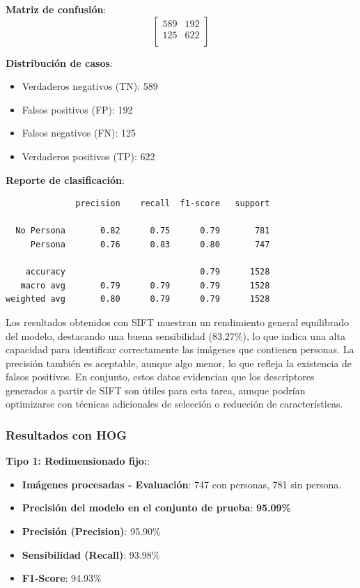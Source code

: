 \documentclass[a4paper]{article}
\begin{document}
\textbf{Matriz de confusión}:
\[
\begin{bmatrix}
589 & 192 \\
125 & 622 \\
\end{bmatrix}
\]

\textbf{Distribución de casos}:
\begin{itemize}
    \item Verdaderos negativos (TN): 589
    \item Falsos positivos (FP): 192
    \item Falsos negativos (FN): 125
    \item Verdaderos positivos (TP): 622
\end{itemize}

\textbf{Reporte de clasificación}:

\begin{verbatim}
              precision    recall  f1-score   support

  No Persona       0.82      0.75      0.79       781
     Persona       0.76      0.83      0.80       747

    accuracy                           0.79      1528
   macro avg       0.79      0.79      0.79      1528
weighted avg       0.80      0.79      0.79      1528
\end{verbatim}

Los resultados obtenidos con SIFT muestran un rendimiento general equilibrado del modelo, destacando una buena sensibilidad (83.27\%), lo que indica una alta capacidad para identificar correctamente las imágenes que contienen personas. La precisión también es aceptable, aunque algo menor, lo que refleja la existencia de falsos positivos. En conjunto, estos datos evidencian que los descriptores generados a partir de SIFT son útiles para esta tarea, aunque podrían optimizarse con técnicas adicionales de selección o reducción de características.

\vspace{0.5cm}
\subsubsection*{Resultados con HOG}

\textbf{Tipo 1: Redimensionado fijo:}:

\begin{itemize}
    \item \textbf{Imágenes procesadas - Evaluación}: 747 con personas, 781 sin persona.
    \item \textbf{Precisión del modelo en el conjunto de prueba}: \textbf{95.09\%}
    \item \textbf{Precisión (Precision)}: 95.90\%
    \item \textbf{Sensibilidad (Recall)}: 93.98\%
    \item \textbf{F1-Score}: 94.93\%
\end{itemize}
\end{document}
